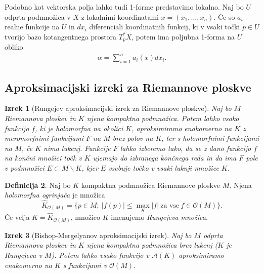 \documentclass[12pt,a4paper,twoside]{article}
\theoremstyle{definition} %
\newtheorem{definicija}{Definicija}[section]
\theoremstyle{plain} %
\newtheorem{izrek}[definicija]{Izrek}
\numberwithin{equation}{section}  %
\begin{document}
Podobno kot vektorska polja lahko tudi 1-forme predstavimo lokalno. Naj bo $U$ odprta podmnožica v $X$ z lokalnimi koordinatami $x = (x_{1}, \dots, x_{n})$. Če so $a_{i}$ realne funkcije na $U$ in $dx_{i}$ diferenciali koordinatnih funkcij, ki v vsaki točki $p \in U$ tvorijo bazo kotangentnega prostora $T_{p}^{*}X$, potem ima poljubna 1-forma na $U$ obliko
\begin{align}
\alpha = \sum_{i=1}^{n} a_{i}(x) dx_{i}.
\end{align}

\subsection{Aproksimacijski izreki za Riemannove ploskve}
%
\begin{izrek} [Rungejev aproksimacijski izrek za Riemannove ploskve]
Naj bo $M$ Riemannova ploskev in $K$ njena kompaktna podmnožica. 
Potem lahko vsako funkcijo $f$, ki je holomorfna na okolici $K$, aproksimiramo enakomerno na $K$ z meromorfnimi funkcijami $F$ na $M$ brez polov na $K$, ter s holomorfnimi funkcijami na $M$, če $K$ nima lukenj.
Funkcije $F$ lahko izberemo tako, da se z dano funkcijo $f$ na končni množici točk v $K$ ujemajo do izbranega končnega reda in da ima $F$ pole v podmnožici $E \subset M \backslash K$, kjer $E$ vsebuje točko v vsaki luknji množice $K$. 
\end{izrek}

\begin{definicija}
Naj bo $K$ kompaktna podmnožica Riemannove ploskve $M$. Njena \emph{holomorfna ogrinjača} je množica 
\begin{equation}
\widehat{K}_{\mathcal{O}(M)} = \{p \in M ; \ |f(p)| \leq \max_{K} |f| \ \text{za vse} \ f \in \mathcal{O}(M) \}.
\end{equation}
Če velja $K = \widehat{K}_{\mathcal{O}(M)}$, množico $K$ imenujemo \emph{Rungejeva množica}.
\end{definicija}

\begin{izrek} [Bishop-Mergelyanov aproksimacijski izrek] \label{izr:Bishop-Mergelyan}
Naj bo $M$ odprta Riemannova ploskev in $K$ njena kompaktna podmnožica brez lukenj ($K$ je Rungejeva v $M$). Potem lahko vsako funkcijo v $\mathcal{A}(K)$ aproksimiramo enakomerno na $K$ s funkcijami v $\mathcal{O}(M)$.
\end{izrek}
\end{document}
